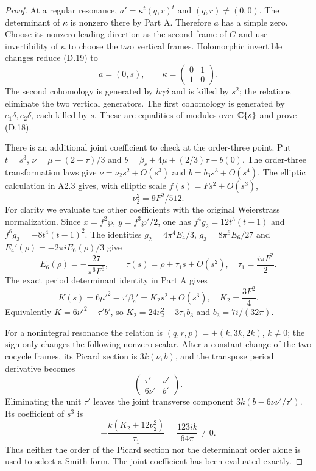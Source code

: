 \begin{proof}
At a regular resonance, $a'=\kappa^t(q,r)^t$ and
$(q,r)\ne(0,0)$. The determinant of $\kappa$ is nonzero there by
Part A. Therefore $a$ has a simple zero. Choose its nonzero leading
direction as the second frame of $G$ and use invertibility of
$\kappa$ to choose the two vertical frames. Holomorphic invertible
changes reduce (D.19) to
\[
 a=(0,s),\qquad \kappa=\begin{pmatrix}0&1\\1&0\end{pmatrix}. \tag{D.21}
\]
The second cohomology is generated by $h\gamma\delta$ and is killed
by $s^2$; the relations eliminate the two vertical generators.
The first cohomology is generated by $e_1\delta,e_2\delta$, each
killed by $s$. These are equalities of modules over $\mathbb C\{s\}$
and prove (D.18).

There is an additional joint coefficient to check at the order-three
point. Put $t=s^3$, $\nu=\mu-(2-\tau)/3$ and
$b=\beta_c+4\mu+(2/3)\tau-b(0)$. The order-three transformation
laws give $\nu=\nu_2s^2+O(s^3)$ and $b=b_3s^3+O(s^4)$.
The elliptic calculation in A2.3 gives, with elliptic scale
$f(s)=F s^2+O(s^3)$,
\[
 \nu_2^2=9F^2/512.
\]
For clarity we evaluate the other coefficients with the original
Weierstrass normalization. Since $x=f^2\wp$,
$y=f^3\wp'/2$, one has
$f^4g_2=12t^3(t-1)$ and $f^6g_3=-8t^4(t-1)^2$.
The identities $g_2=4\pi^4E_4/3$, $g_3=8\pi^6E_6/27$ and
$E_4'(\rho)=-2\pi iE_6(\rho)/3$ give
\[
 E_6(\rho)=-\frac{27}{\pi^6F^6},\qquad
 \tau(s)=\rho+\tau_1s+O(s^2),\quad \tau_1=\frac{i\pi F^2}{2}.
\]
The exact period determinant identity in Part A gives
\[
 K(s)=6\mu'^2-\tau'\beta_c'=K_2s^2+O(s^3),
 \quad K_2=\frac{3F^2}{4}.
\]
Equivalently $K=6\nu'^2-\tau'b'$, so
$K_2=24\nu_2^2-3\tau_1b_3$ and $b_3=7i/(32\pi)$.

For a nonintegral resonance the relation is
$(q,r,p)=\pm(k,3k,2k)$, $k\ne0$; the sign only changes the
following nonzero scalar. After a constant change of the two
cocycle frames, its Picard section is $3k(\nu,b)$, and the
transpose period derivative becomes
\[
 \begin{pmatrix}\tau'&\nu'\\6\nu'&b'\end{pmatrix}.
\]
Eliminating the unit $\tau'$ leaves the joint transverse component
$3k(b-6\nu\nu'/\tau')$. Its coefficient of $s^3$ is
\[
 -\frac{k(K_2+12\nu_2^2)}{\tau_1}
       =\frac{123ik}{64\pi}\ne0.                      \tag{D.22}
\]
Thus neither the order of the Picard section nor the determinant
order alone is used to select a Smith form. The joint coefficient
has been evaluated exactly.


\end{proof}
